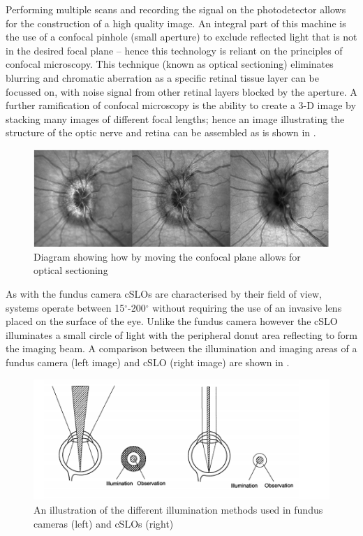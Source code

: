 Performing multiple scans and recording the signal on the photodetector
allows for the construction of a high quality image. An integral part of
this machine is the use of a confocal pinhole (small aperture) to exclude
reflected light that is not in the desired focal plane – hence this technology
is reliant on the principles of confocal microscopy. This technique (known as
optical sectioning) eliminates blurring and chromatic aberration as a specific
retinal tissue layer can be focussed on, with noise signal from other retinal
layers blocked by the aperture.\cite{sharp2004scanning} A further ramification
of confocal microscopy is the ability to create a 3-D image by stacking many
images of different focal lengths; hence an image illustrating the structure
of the optic nerve and retina can be assembled as is shown in .

\begin{figure}[htbp]
\centering
\includegraphics{figures/confocalimages}
\caption{Diagram showing how by moving the confocal plane allows for optical sectioning}
\label{fig:3dconfocal}
\end{figure}

As with the fundus camera cSLOs are characterised by their field of view,
systems operate between 15$^\circ$-200$^\circ$ without requiring the use of
an invasive lens placed on the surface of the eye. Unlike the fundus camera
however the cSLO illuminates a small circle of light with the peripheral donut
area reflecting to form the imaging beam. A comparison between the illumination
and imaging areas of a fundus camera (left image) and cSLO (right image) are
shown in  .


\begin{figure}[htbp]
\centering
\includegraphics{figures/illumination}
\caption{An illustration of the different illumination methods used in fundus cameras (left) and cSLOs (right)}
\label{fig:illum}
   \end{figure}


